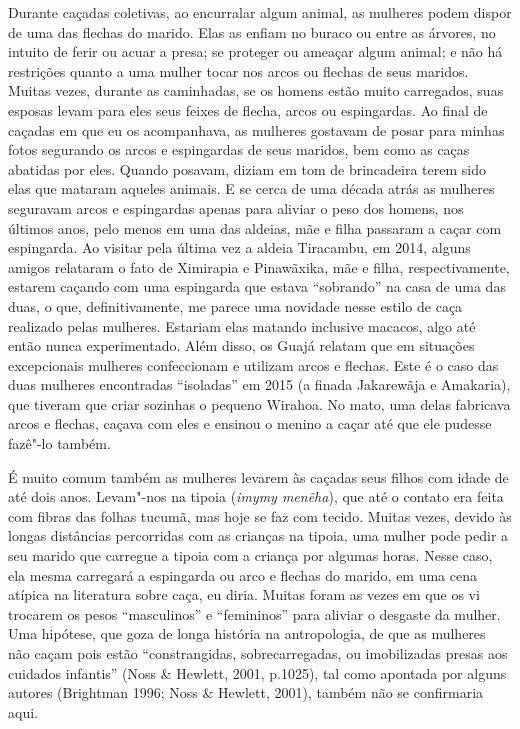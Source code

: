 Durante caçadas coletivas, ao encurralar algum animal, as mulheres podem
dispor de uma das flechas do marido. Elas as enfiam no buraco ou entre
as árvores, no intuito de ferir ou acuar a presa; se proteger ou ameaçar
algum animal; e não há restrições quanto a uma mulher tocar nos arcos ou
flechas de seus maridos. Muitas vezes, durante as caminhadas, se os
homens estão muito carregados, suas esposas levam para eles seus feixes
de flecha, arcos ou espingardas. Ao final de caçadas em que eu os
acompanhava, as mulheres gostavam de posar para minhas fotos segurando
os arcos e espingardas de seus maridos, bem como as caças abatidas por
eles. Quando posavam, diziam em tom de brincadeira terem sido elas que
mataram aqueles animais. E se cerca de uma década atrás as mulheres
seguravam arcos e espingardas apenas para aliviar o peso dos homens, nos
últimos anos, pelo menos em uma das aldeias, mãe e filha passaram a
caçar com espingarda. Ao visitar pela última vez a aldeia Tiracambu, em
2014, alguns amigos relataram o fato de Ximirapia e Pinawãxika, mãe e
filha, respectivamente, estarem caçando com uma espingarda que estava
``sobrando'' na casa de uma das duas, o que, definitivamente, me parece
uma novidade nesse estilo de caça realizado pelas mulheres. Estariam
elas matando inclusive macacos, algo até então nunca experimentado. Além
disso, os Guajá relatam que em situações excepcionais mulheres
confeccionam e utilizam arcos e flechas. Este é o caso das duas mulheres
encontradas ``isoladas'' em 2015 (a finada Jakarewãja e Amakaria), que
tiveram que criar sozinhas o pequeno Wirahoa. No mato, uma delas
fabricava arcos e flechas, caçava com eles e ensinou o menino a caçar
até que ele pudesse fazê"-lo também.

É muito comum também as mulheres levarem às caçadas seus filhos com
idade de até dois anos. Levam"-nos na tipoia (\emph{imymy menẽha}), que
até o contato era feita com fibras das folhas tucumã, mas hoje se faz
com tecido. Muitas vezes, devido às longas distâncias percorridas com as
crianças na tipoia, uma mulher pode pedir a seu marido que carregue a
tipoia com a criança por algumas horas. Nesse caso, ela mesma carregará
a espingarda ou arco e flechas do marido, em uma cena atípica na
literatura sobre caça, eu diria. Muitas foram as vezes em que os vi
trocarem os pesos ``masculinos'' e ``femininos'' para aliviar o desgaste da
mulher. Uma hipótese, que goza de longa história na antropologia, de que
as mulheres não caçam pois estão ``constrangidas, sobrecarregadas, ou
imobilizadas presas aos cuidados infantis'' (Noss \& Hewlett, 2001,
p.1025), tal como apontada por alguns autores (Brightman 1996; Noss \&
Hewlett, 2001), também não se confirmaria aqui.

